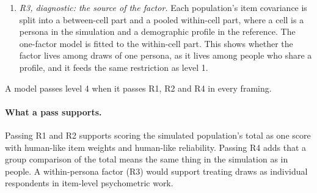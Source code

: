 \begin{enumerate}
where $\Delta F$ is the change in the fit function, $d$ the change in degrees of freedom, $G$ the number of groups and $\nu$ the expected $\Delta F$ under exact invariance. Draws are clustered in personas and the items are coarse, so $\nu$ is estimated by permuting group labels among personas \citep{jorgensen2018permutation}. A step holds when the upper limit of its 90\% interval is below the margin, fails when the lower limit is above it, and is indeterminate otherwise \citep{yuanchan2016invariance,marcoulides2017equivalence}. The margin is .08, because the reference itself fails or is indeterminate on three of its six steps at .05; .05 is a sensitivity analysis. R4 passes when every model step matches the reference's verdict on the same step, fails when any determinate step differs from it, and is unresolved when no step differs but some are indeterminate.
A model with an indeterminate step therefore cannot pass R4, and a design needs enough personas per group to resolve every step.
\item \emph{R3, diagnostic: the source of the factor.} Each population's item covariance is split into a between-cell part and a pooled within-cell part, where a cell is a persona in the simulation and a demographic profile in the reference. The one-factor model is fitted to the within-cell part. This shows whether the factor lives among draws of one persona, as it lives among people who share a profile, and it feeds the same restriction as level 1.
\end{enumerate}
A model passes level 4 when it passes R1, R2 and R4 in every framing.

\paragraph{What a pass supports.}
Passing R1 and R2 supports scoring the simulated population's total as one score with human-like item weights and human-like reliability.
Passing R4 adds that a group comparison of the total means the same thing in the simulation as in people.
A within-persona factor (R3) would support treating draws as individual respondents in item-level psychometric work.
